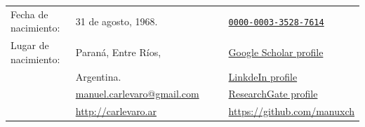 %
%
\begin{center}
	\begin{tabular}{l l p{1cm} c l}
		Fecha de nacimiento:                                  & 31 de agosto, 1968.                                                  &  &          & \href{https://orcid.org/0000-0003-3528-7614}{\texttt{0000-0003-3528-7614}}                                          \\

		Lugar de nacimiento:                                  & Paraná, Entre Ríos,                                                  &  &  & \href{https://scholar.google.com.ar/citations?user=FoBqqJgAAAAJ                    & hl=en}{Google Scholar profile} \\
		                                                      & Argentina.                                                           &  & \color{DimGrey}{\faLinkedin}            & \href{https://www.linkedin.com/in/carlevaro/}{LinkdeIn profile}                                                     \\
		      & \href{mailto:manuel.carlevaro@gmail.com}{manuel.carlevaro@gmail.com} &  & \color{DimGrey}{\aiResearchGate}        & \href{https://www.researchgate.net/profile/Manuel-Carlevaro}{ResearchGate profile}                                  \\
		 & \href{http://carlevaro.ar}{http://carlevaro.ar}                      &  & \color{DimGrey}{\faGithub}              & \href{https://github.com/manuxch}{https://github.com/manuxch}
	\end{tabular}
\end{center}
\vspace{0.5cm}
